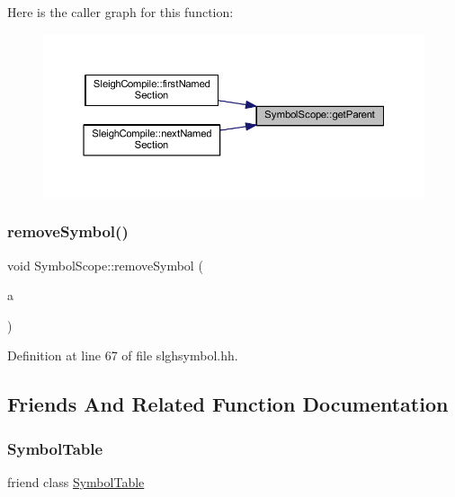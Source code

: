 Here is the caller graph for this function\+:
\nopagebreak
\begin{figure}[H]
\begin{center}
\leavevmode
\includegraphics[width=350pt]{class_symbol_scope_aedff22c75734b479c4ce48cb87a2be23_icgraph}
\end{center}
\end{figure}
\mbox{\label{class_symbol_scope_a1b5507b8f6189308750c907f7e154a78}} 
\subsubsection{\texorpdfstring{removeSymbol()}{removeSymbol()}}
{\footnotesize\ttfamily void Symbol\+Scope\+::remove\+Symbol (\begin{DoxyParamCaption}\item[{\mbox{\hyperlink{class_sleigh_symbol}{Sleigh\+Symbol}} $\ast$}]{a }\end{DoxyParamCaption})\hspace{0.3cm}{\ttfamily [inline]}}



Definition at line 67 of file slghsymbol.\+hh.



\subsection{Friends And Related Function Documentation}
\mbox{\label{class_symbol_scope_ac1b80bc52166901e909169b2657de45f}} 
\subsubsection{\texorpdfstring{SymbolTable}{SymbolTable}}
{\footnotesize\ttfamily friend class \mbox{\hyperlink{class_symbol_table}{Symbol\+Table}}\hspace{0.3cm}{\ttfamily [friend]}}



